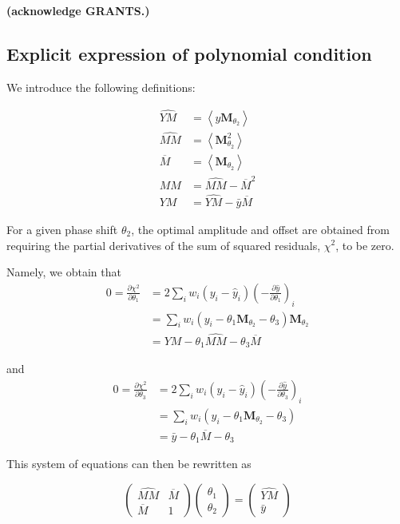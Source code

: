 \documentclass[apj]{emulateapj}
\newcommand{\todo}[1]{{\bf #1}}
\newcommand{\savg}[1]{\left<#1\right>}
\newcommand{\Mshft}{\mathbf{M}_{\theta_2}}
\newcommand{\MMhat}{\widehat{MM}}
\newcommand{\YMhat}{\widehat{YM}}
\newcommand{\Mbar}{\overline{M}}
\begin{document}
\begin{acknowledgements}
\todo{(acknowledge GRANTS.)}
\end{acknowledgements}
\begin{appendix}
\section{Explicit expression of polynomial condition}

We introduce the following definitions:

\begin{align}
\YMhat &= \savg{y\Mshft}\\
\MMhat &= \savg{\Mshft^2}\\
\Mbar &= \savg{\Mshft}\\
MM &= \MMhat - \Mbar^2\\
YM &= \YMhat - \bar{y}\Mbar
\end{align}

For a given phase shift $\theta_2$, the optimal amplitude and
offset are obtained from requiring the partial derivatives of the
sum of squared residuals, $\chi^2$, to be zero.

Namely, we obtain that
\begin{align}
0 = \frac{\partial\chi^2}{\partial\theta_1} &= 2\sum_iw_i(y_i - \hat{y}_i)\left(-\frac{\partial\hat{y}}{\partial\theta_1}\right)_i\\
    &= \sum_iw_i(y_i - \theta_1\Mshft - \theta_3)\Mshft\\
    &= YM - \theta_1 \MMhat - \theta_3 \Mbar
\end{align}

and
\begin{align}
0 = \frac{\partial\chi^2}{\partial\theta_3} &= 2\sum_iw_i(y_i - \hat{y}_i)\left(-\frac{\partial\hat{y}}{\partial\theta_3}\right)_i\\
    &= \sum_iw_i(y_i - \theta_1\Mshft - \theta_3)\\
    &= \bar{y} - \theta_1 \Mbar - \theta_3
\end{align}

This system of equations can then be rewritten as

\begin{equation}
\begin{pmatrix} \MMhat & \Mbar \\ \Mbar & 1 \end{pmatrix}
\begin{pmatrix} \theta_1 \\ \theta_2 \end{pmatrix}
= 
\begin{pmatrix} \YMhat \\ \bar{y}\end{pmatrix}
\end{equation}


\end{appendix}
\end{document}
